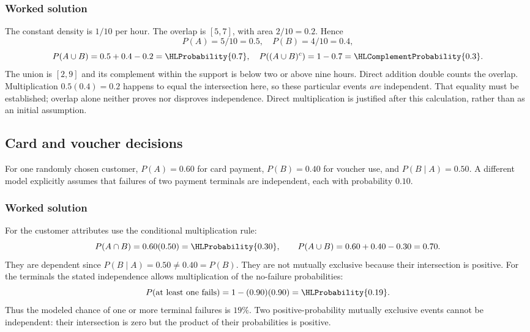 \subsubsection*{Worked solution}\label{sol:sec:general-worked1}
The constant density is $1/10$ per hour. The overlap is $[5,7]$, with area $2/10=0.2$. Hence
\[
P(A)=5/10=0.5,\quad P(B)=4/10=0.4,
\]
\[
P(A\cup B)=0.5+0.4-0.2=\HLProbability{0.7},\quad
P((A\cup B)^c)=1-0.7=\HLComplementProbability{0.3}.
\]
The union is $[2,9]$ and its complement within the support is below two or above nine hours. Direct addition double counts the overlap. Multiplication $0.5(0.4)=0.2$ happens to equal the intersection here, so these particular events \emph{are} independent. That equality must be established; overlap alone neither proves nor disproves independence. Direct multiplication is justified after this calculation, rather than as an initial assumption.


\subsection{Card and voucher decisions}\label{prob:sec:general-worked2}
For one randomly chosen customer, $P(A)=0.60$ for card payment, $P(B)=0.40$ for voucher use, and $P(B\mid A)=0.50$. A different model explicitly assumes that failures of two payment terminals are independent, each with probability $0.10$.
\subsubsection*{Worked solution}\label{sol:sec:general-worked2}
For the customer attributes use the conditional multiplication rule:
\[
P(A\cap B)=0.60(0.50)=\HLProbability{0.30},
\qquad P(A\cup B)=0.60+0.40-0.30=0.70.
\]
They are dependent since $P(B\mid A)=0.50\ne0.40=P(B)$. They are not mutually exclusive because their intersection is positive.
For the terminals the stated independence allows multiplication of the no-failure probabilities:
\[
P(\text{at least one fails})=1-(0.90)(0.90)=\HLProbability{0.19}.
\]
Thus the modeled chance of one or more terminal failures is $19\%$. Two positive-probability mutually exclusive events cannot be independent: their intersection is zero but the product of their probabilities is positive.
